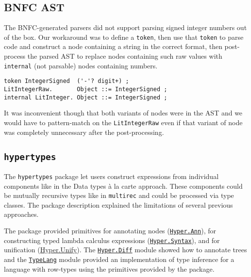 \subsection{BNFC AST}
\label{chap:LiteratureReview:sec:AstRepresentations:BnfcAst}

The BNFC-generated parsers did not support parsing signed integer numbers out of the box.
Our workaround was to define a \texttt{token}, then use that \texttt{token} to parse code and construct a node containing a string in the correct format, then post-process the parsed AST to replace nodes containing such raw values with \texttt{internal} (not parsable) nodes containing numbers.

\begin{verbatim}
token IntegerSigned  ('-'? digit+) ;
LitIntegerRaw.       Object ::= IntegerSigned ;
internal LitInteger. Object ::= IntegerSigned ;
\end{verbatim}

It was inconvenient though that both variants of nodes were in the AST and we would have to pattern-match on the \texttt{LitIntegerRaw} even if that variant of node was completely unnecessary after the post-processing.

\subsection{\texttt{hypertypes}}
\label{chap:LiteratureReview:sec:AstRepresentations:Hypertypes}

The \texttt{hypertypes} package \cite{hypertypes-hackage} let users construct expressions from individual components like in the Data types à la carte \cite{swierstra-data-2008} approach. These components could be mutually recursive types like in \texttt{multirec} \cite{multirec-hackage} and could be processed via type classes. The package description explained the limitations of several previous approaches.

The package provided primitives for annotating nodes (\href{https://hackage.haskell.org/package/hypertypes-0.2.2/docs/Hyper-Combinator-Ann.html}{\texttt{Hyper.Ann}}), for constructing typed lambda calculus expressions (\href{https://hackage.haskell.org/package/hypertypes-0.2.2/docs/Hyper-Syntax.html}{\texttt{Hyper.Syntax}}), and for unification (\href{https://hackage.haskell.org/package/hypertypes-0.2.2/docs/Hyper-Unify.html}{Hyper.Unify}). The \href{https://github.com/lamdu/hypertypes/blob/06cf48ef9c85c54cbe722a448754cb89931b23e7/src/Hyper/Diff.hs}{\texttt{Hyper.Diff}} module showed how to annotate trees and the \href{https://github.com/lamdu/hypertypes/tree/06cf48ef9c85c54cbe722a448754cb89931b23e7/test/TypeLang.hs}{\texttt{TypeLang}} module provided an implementation of type inference for a language with row-types using the primitives provided by the package.

